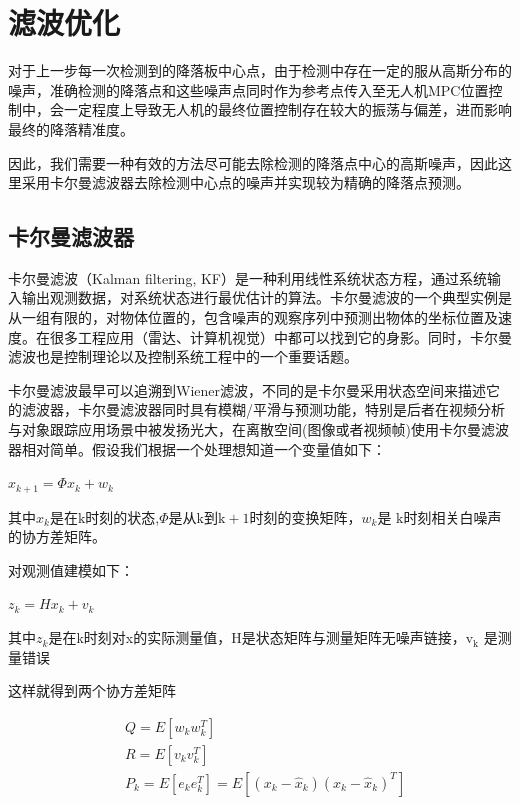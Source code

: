 \section{滤波优化}

对于上一步每一次检测到的降落板中心点，由于检测中存在一定的服从高斯分布的噪声，准确检测的降落点和这些噪声点同时作为参考点传入至无人机MPC位置控制中，会一定程度上导致无人机的最终位置控制存在较大的振荡与偏差，进而影响最终的降落精准度。

因此，我们需要一种有效的方法尽可能去除检测的降落点中心的高斯噪声，因此这里采用卡尔曼滤波器去除检测中心点的噪声并实现较为精确的降落点预测。

\subsection{卡尔曼滤波器}

卡尔曼滤波（Kalman filtering, KF）是一种利用线性系统状态方程，通过系统输入输出观测数据，对系统状态进行最优估计的算法。卡尔曼滤波的一个典型实例是从一组有限的，对物体位置的，包含噪声的观察序列中预测出物体的坐标位置及速度。在很多工程应用（雷达、计算机视觉）中都可以找到它的身影。同时，卡尔曼滤波也是控制理论以及控制系统工程中的一个重要话题。

卡尔曼滤波最早可以追溯到Wiener滤波，不同的是卡尔曼采用状态空间来描述它的滤波器，卡尔曼滤波器同时具有模糊/平滑与预测功能，特别是后者在视频分析与对象跟踪应用场景中被发扬光大，在离散空间(图像或者视频帧)使用卡尔曼滤波器相对简单。假设我们根据一个处理想知道一个变量值如下：

$x_{k+1}=\Phi x_{k}+w_{k}$

其中$x_{k}$是在$\mathrm{k}$时刻的状态,$\Phi$是从$\mathrm{k}$到$\mathrm{k}+1$时刻的变换矩阵，$w_{k}$是 $\mathrm{k}$时刻相关白噪声的协方差矩阵。

对观测值建模如下：

$z_{k}=H x_{k}+v_{k}$

其中$z_{k}$是在k时刻对x的实际测量值，$\mathrm{H}$是状态矩阵与测量矩阵无噪声链接，$\mathrm{v}_{\mathrm{k}}$ 是测量错误

这样就得到两个协方差矩阵

$$
\begin{aligned}
&Q=E\left[w_{k} w_{k}^{T}\right] \\
&R=E\left[v_{k} v_{k}^{T}\right] \\
&P_{k}=E\left[e_{k} e_{k}^{T}\right]=E\left[\left(x_{k}-\hat{x}_{k}\right)\left(x_{k}-\hat{x}_{k}\right)^{T}\right]
\end{aligned}
$$

